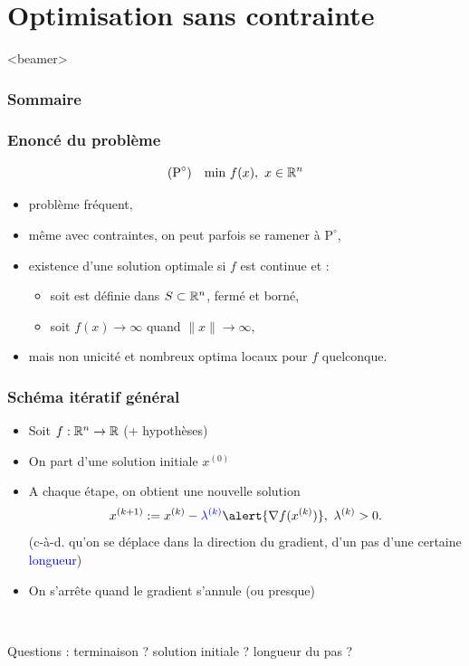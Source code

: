 \documentclass{beamer}
\newcommand{\R}{{\ensuremath\mathbb{R}}}
\begin{document}
\section{Optimisation sans contrainte}

\begin{frame}<beamer>
  \frametitle{Sommaire}
  \tableofcontents[currentsection]
\end{frame}

\begin{frame}
  \frametitle{Enoncé du problème}

  \[
  (\text{P}^\circ) \quad
    \text{min} \ f(x), \ x \in \R^n
  \]

  \begin{itemize}
  \item problème fréquent,
  \item même avec contraintes, on peut parfois se ramener à $\text{P}^\circ$,
  \item existence d'une solution optimale si $f$ est continue et :
    \begin{itemize}
    \item soit est définie dans $S \subset \R^n$, fermé et borné,
    \item soit $f(x) \rightarrow \infty$ quand $\|x\| \rightarrow \infty$, 
    \end{itemize}
  \item mais non unicité et nombreux optima locaux pour $f$ quelconque.
  \end{itemize}
  
\end{frame}

\begin{frame}
  \frametitle{Schéma itératif général}

  \begin{itemize}
  \item Soit $f : \R^n \rightarrow \R$ (+ hypothèses)
  \item On part d'une solution initiale $x^{(0)}$
  \item A chaque étape, on obtient une nouvelle solution
    \[ x^{(k+1)} := x^{(k)} - \textcolor{blue}{\lambda^{(k)}} \alert{{\nabla f}(x^{(k)})}, \ \lambda^{(k)} > 0. \]
    (c-à-d. qu'on se déplace dans la direction du \alert{gradient},
    d'un pas d'une certaine \textcolor{blue}{longueur})
  \item On s'arrête quand le gradient s'annule (ou presque)
  \end{itemize}

  ~

  Questions : 
  terminaison ?
  solution initiale ?
  longueur du pas ?
\end{frame}
\end{document}
